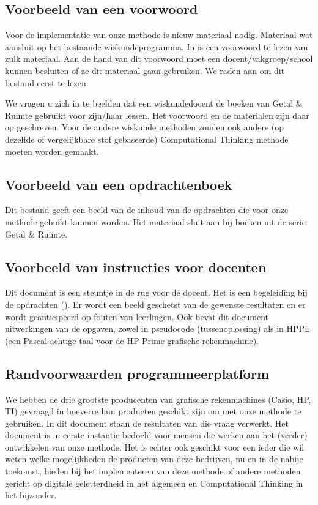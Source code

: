 \documentclass[a4paper]{article}
\begin{document}
\subsection{Voorbeeld van een voorwoord \cite{voorwoord}} Voor de implementatie van onze methode is nieuw materiaal nodig. Materiaal wat aansluit op het bestaande wiskundeprogramma. In \cite{voorwoord} is een voorwoord te lezen van zulk materiaal. Aan de hand van dit voorwoord moet een docent/vakgroep/school kunnen besluiten of ze dit materiaal gaan gebruiken.  We raden aan om dit bestand eerst te lezen.

We vragen u zich in te beelden dat een wiskundedocent de boeken van Getal \& Ruimte gebruikt voor zijn/haar lessen. Het voorwoord en de materialen zijn daar op geschreven. Voor de andere wiskunde methoden zouden ook andere (op dezelfde of vergelijkbare stof gebaseerde) Computational Thinking methode moeten worden gemaakt.

\subsection{Voorbeeld van een opdrachtenboek \cite{opdrachten}}
Dit bestand geeft een beeld van de inhoud van de opdrachten die voor onze methode gebuikt kunnen worden. Het materiaal sluit aan bij boeken uit de serie Getal \& Ruimte. 
\subsection{Voorbeeld van instructies voor docenten \cite{instructies}}
Dit document is een steuntje in de rug voor de docent. Het is een begeleiding bij de opdrachten (\cite{opdrachten}). Er wordt een beeld geschetst van de gewenste resultaten en er wordt geanticipeerd op fouten van leerlingen. Ook bevat dit document uitwerkingen van de opgaven, zowel in pseudocode (tussenoplossing) als in HPPL (een Pascal-achtige taal voor de HP Prime grafische rekenmachine).
\subsection{Randvoorwaarden programmeerplatform \cite{progplatform}}\label{programmeerplatform}
We hebben de drie grootste producenten van grafische rekenmachines (Casio, HP, TI) gevraagd in hoeverre hun producten geschikt zijn om met onze methode te gebruiken. In dit document staan de resultaten van die vraag verwerkt. Het document is in eerste instantie bedoeld voor mensen die werken aan het (verder) ontwikkelen van onze methode.  Het is echter ook geschikt voor een ieder die wil weten welke mogelijkheden de producten van deze bedrijven, nu en in de nabije toekomst, bieden bij het implementeren van deze methode of andere methoden gericht op digitale geletterdheid in het algemeen en Computational Thinking in het bijzonder.
\end{document}
